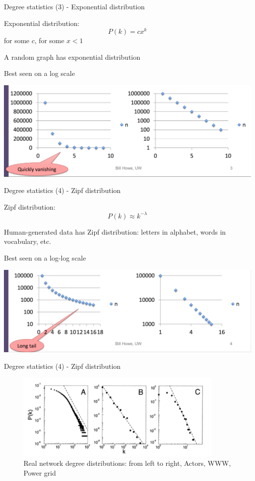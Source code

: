 \begin{frame}{Degree statistics (3) - Exponential distribution}

\BI
\item Exponential distribution:
\[
  P(k) = c x^k
\]
for some $c$, for some $x<1$
\item A \alert{random graph} has exponential distribution 
\item Best seen on a log scale
\EI
		
\includegraphics[width=1.0\textwidth]{figs/xx/degree1}
		
\end{frame}

\begin{frame}{Degree statistics (4) - Zipf distribution}

\BI
\item Zipf distribution:
\[
  P(k) \approx k^{-\lambda}
\]
\item Human-generated data has Zipf distribution: letters in alphabet, words in vocabulary, etc.
\item Best seen on a log-log scale
\EI
		
\includegraphics[width=1.0\textwidth]{figs/xx/degree2}
		
\end{frame}

\begin{frame}{Degree statistics (4) - Zipf distribution}
\begin{figure}
	\includegraphics[width=0.9\textwidth]{figs/08/threeex}
	\caption{Real network degree distributions: from left to right, Actors, WWW, Power grid}
\end{figure}
\end{frame}



